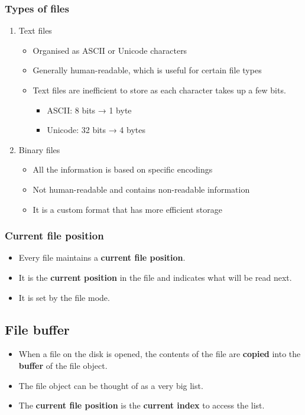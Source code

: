 \documentclass[11pt]{article}
\begin{document}
\subsubsection{Types of files}
\label{sec:org94f2733}
\begin{enumerate}
\item Text files
\begin{itemize}
\item Organised as ASCII or Unicode characters
\item Generally human-readable, which is useful for certain file types
\item Text files are inefficient to store as each character takes up a few bits.
\begin{itemize}
\item ASCII: 8 bits → 1 byte
\item Unicode: 32 bits → 4 bytes
\end{itemize}
\end{itemize}

\item Binary files
\begin{itemize}
\item All the information is based on specific encodings
\item Not human-readable and contains non-readable information
\item It is a custom format that has more efficient storage
\end{itemize}
\end{enumerate}

\subsubsection{Current file position}
\label{sec:orgf9423a0}
\begin{itemize}
\item Every file maintains a \textbf{current file position}.
\item It is the \textbf{current position} in the file and indicates what will be read next.
\item It is set by the file mode.
\end{itemize}

\subsection{File buffer}
\label{sec:org28beb17}
\begin{itemize}
\item When a file on the disk is opened, the contents of the file are \textbf{copied} into the \textbf{buffer} of the file object.
\item The file object can be thought of as a very big list.
\item The \textbf{current file position} is the \textbf{current index} to access the list.
\end{itemize}
\end{document}
